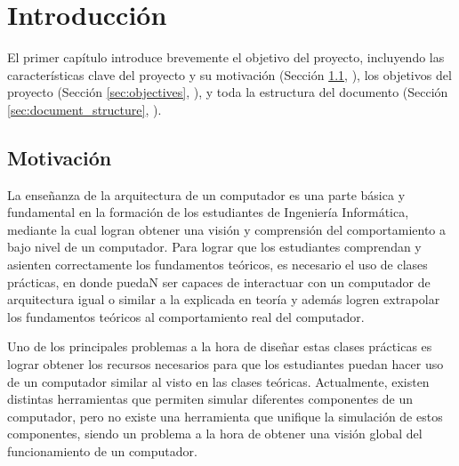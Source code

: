 \chead[]{}
\renewcommand{\headrulewidth}{0.5pt}

\lfoot[]{}
\cfoot[]{}
\rfoot[]{}
\renewcommand{\footrulewidth}{0pt}

\chapter{Introducción}
\label{ch:introduction}

El primer capítulo introduce brevemente el objetivo del proyecto, incluyendo las características clave del proyecto y su motivación (Sección \ref{sec:background_and_motivation}, \textit{}), los objetivos del proyecto (Sección \ref{sec:objectives}, \textit{}), y toda la estructura del documento (Sección \ref{sec:document_structure}, \textit{}).

\section{Motivación}
\label{sec:background_and_motivation}

La enseñanza de la arquitectura de un computador es una parte básica y fundamental en la formación de los estudiantes de Ingeniería Informática, mediante la cual logran obtener una visión y comprensión del comportamiento a bajo nivel de un computador. Para lograr que los estudiantes comprendan y asienten correctamente los fundamentos teóricos, es necesario el uso de clases prácticas, en donde puedaN ser capaces de interactuar con un computador de arquitectura igual o similar a la explicada en teoría y además logren extrapolar los fundamentos teóricos al comportamiento real del computador.

Uno de los principales problemas a la hora de diseñar estas clases prácticas es lograr obtener los recursos necesarios para que los estudiantes puedan hacer uso de un computador similar al visto en las clases teóricas. Actualmente, existen distintas herramientas que permiten simular diferentes componentes de un computador, pero no existe una herramienta que unifique la simulación de estos componentes, siendo un problema a la hora de obtener una visión global del funcionamiento de un computador.

